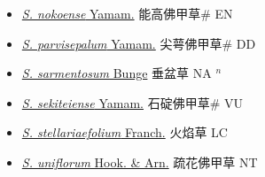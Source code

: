 \begin{itemize}
\begin{itemize}
        \item[] \href{http://www.theplantlist.org/tpl1.1/search?q=Sedum+nokoense}{\textit{S. nokoense} Yamam.}   能高佛甲草\# EN
        \item[] \href{http://www.theplantlist.org/tpl1.1/search?q=Sedum+parvisepalum}{\textit{S. parvisepalum} Yamam.}   尖萼佛甲草\# DD
        \item[] \href{http://www.theplantlist.org/tpl1.1/search?q=Sedum+sarmentosum}{\textit{S. sarmentosum} Bunge}   垂盆草 NA $^n$
        \item[] \href{http://www.theplantlist.org/tpl1.1/search?q=Sedum+sekiteiense}{\textit{S. sekiteiense} Yamam.}   石碇佛甲草\# VU
        \item[] \href{http://www.theplantlist.org/tpl1.1/search?q=Sedum+stellariaefolium}{\textit{S. stellariaefolium} Franch.}   火焰草 LC
        \item[] \href{http://www.theplantlist.org/tpl1.1/search?q=Sedum+uniflorum}{\textit{S. uniflorum} Hook. \& Arn.}   疏花佛甲草 NT
  \end{itemize}
  \end{itemize}
